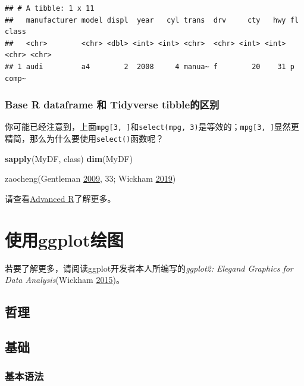 \documentclass[]{book}
\newenvironment{Shaded}{\begin{snugshade}}{\end{snugshade}}
\newcommand{\KeywordTok}[1]{\textcolor[rgb]{0.13,0.29,0.53}{\textbf{#1}}}
\newcommand{\NormalTok}[1]{#1}
\begin{document}
\begin{verbatim}
## # A tibble: 1 x 11
##   manufacturer model displ  year   cyl trans  drv     cty   hwy fl    class
##   <chr>        <chr> <dbl> <int> <int> <chr>  <chr> <int> <int> <chr> <chr>
## 1 audi         a4        2  2008     4 manua~ f        20    31 p     comp~
\end{verbatim}

\hypertarget{tibble-df-diff}{%
\subsection{Base R dataframe 和 Tidyverse tibble的区别}\label{tibble-df-diff}}

你可能已经注意到，上面\texttt{mpg{[}3,\ {]}}和\texttt{select(mpg,\ 3)}是等效的；\texttt{mpg{[}3,\ {]}}显然更精简，那么为什么要使用\texttt{select()}函数呢？

\begin{Shaded}
\begin{Highlighting}[]
\KeywordTok{sapply}\NormalTok{(MyDF, class)}
\KeywordTok{dim}\NormalTok{(MyDF)}
\end{Highlighting}
\end{Shaded}

zaocheng(Gentleman \protect\hyperlink{ref-Gentleman2009R-Programming-Bioinfo}{2009}, 33; Wickham \protect\hyperlink{ref-Wickham:2019}{2019})

请查看\href{https://adv-r.hadley.nz/subsetting.html\#simplify-preserve}{Advanced R}了解更多。

\hypertarget{graphics}{%
\chapter{使用ggplot绘图}\label{graphics}}

若要了解更多，请阅读ggplot开发者本人所编写的\emph{ggplot2: Elegand Graphics for Data Analysis}(Wickham \protect\hyperlink{ref-Wickham2015ggplot2-Elegant-Gra}{2015})。

\hypertarget{g-phil}{%
\section{哲理}\label{g-phil}}

\hypertarget{g-basics}{%
\section{基础}\label{g-basics}}

\hypertarget{g-basics-grammar}{%
\subsection{基本语法}\label{g-basics-grammar}}
\end{document}

